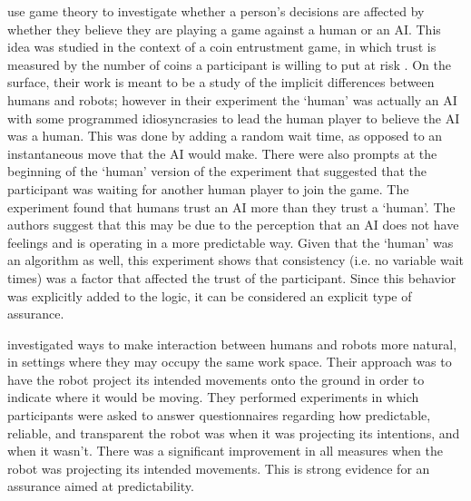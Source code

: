 \citet{Wu2016-ei} use game theory to investigate whether a person's decisions are affected by whether they believe they are playing a game against a human or an AI. This idea was studied in the context of a coin entrustment game, in which trust is measured by the number of coins a participant is willing to put at risk . On the surface, their work is meant to be a study of the implicit differences  between humans and robots; however in their experiment the `human' was actually an AI with some programmed idiosyncrasies to lead the human player to believe the AI was a human. This was done by adding a random wait time, as opposed to an instantaneous move that the AI would make. There were also prompts at the beginning of the `human' version of the experiment that suggested that the participant was waiting for another human player to join the game. The experiment found that humans trust an AI more than they trust a `human'. The authors suggest that this may be due to the perception that an AI does not have feelings and is operating in a more predictable way. Given that the `human' was an algorithm as well, this experiment shows that consistency (i.e. no variable wait times) was a factor that affected the trust of the participant. Since this behavior was explicitly added to the logic, it can be considered an explicit type of assurance. 

  \citet{Chadalavada2015-wx} investigated ways to make interaction between humans and robots more natural, in settings where they may occupy the same work space. Their approach was to have the robot project its intended movements onto the ground in order to indicate where it would be moving. They performed experiments in which participants were asked to answer questionnaires regarding how predictable, reliable, and transparent the robot was when it was projecting its intentions, and when it wasn't. There was a significant improvement in all measures when the robot was projecting its intended movements. This is strong evidence for an assurance aimed at predictability.


